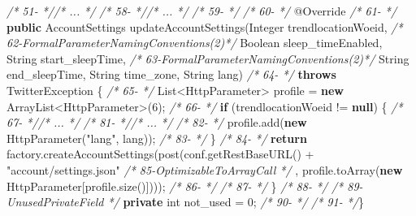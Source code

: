 \documentclass[
]{article}
\newenvironment{Shaded}{\begin{snugshade}}{\end{snugshade}}
\newcommand{\AttributeTok}[1]{\textcolor[rgb]{0.77,0.63,0.00}{#1}}
\newcommand{\BuiltInTok}[1]{#1}
\newcommand{\CommentTok}[1]{\textcolor[rgb]{0.56,0.35,0.01}{\textit{#1}}}
\newcommand{\DataTypeTok}[1]{\textcolor[rgb]{0.13,0.29,0.53}{#1}}
\newcommand{\DecValTok}[1]{\textcolor[rgb]{0.00,0.00,0.81}{#1}}
\newcommand{\FunctionTok}[1]{\textcolor[rgb]{0.00,0.00,0.00}{#1}}
\newcommand{\KeywordTok}[1]{\textcolor[rgb]{0.13,0.29,0.53}{\textbf{#1}}}
\newcommand{\NormalTok}[1]{#1}
\newcommand{\StringTok}[1]{\textcolor[rgb]{0.31,0.60,0.02}{#1}}
\begin{document}
\begin{landscape}
\begin{Shaded}
\begin{Highlighting}[]
\CommentTok{/* 51-                                   *//* ...  */}
\CommentTok{/* 58-                                   *//* ...  */}
\CommentTok{/* 59-                                   */}    
\CommentTok{/* 60-                                   */}    \AttributeTok{@Override}
\CommentTok{/* 61-                                   */}    \KeywordTok{public}\NormalTok{ AccountSettings }\FunctionTok{updateAccountSettings}\NormalTok{(}\BuiltInTok{Integer}\NormalTok{ trendlocationWoeid,}
\CommentTok{/* 62-FormalParameterNamingConventions(2)*/}                                                 \BuiltInTok{Boolean}\NormalTok{ sleep_timeEnabled, }\BuiltInTok{String}\NormalTok{ start_sleepTime,}
\CommentTok{/* 63-FormalParameterNamingConventions(2)*/}                                                 \BuiltInTok{String}\NormalTok{ end_sleepTime, }\BuiltInTok{String}\NormalTok{ time_zone, }\BuiltInTok{String}\NormalTok{ lang)}
\CommentTok{/* 64-                                   */}            \KeywordTok{throws}\NormalTok{ TwitterException \{}
\CommentTok{/* 65-                                   */}        \BuiltInTok{List}\NormalTok{<HttpParameter> profile = }\KeywordTok{new} \BuiltInTok{ArrayList}\NormalTok{<HttpParameter>(}\DecValTok{6}\NormalTok{);}
\CommentTok{/* 66-                                   */}        \KeywordTok{if}\NormalTok{ (trendlocationWoeid != }\KeywordTok{null}\NormalTok{) \{}
\CommentTok{/* 67-                                   *//* ...  */}
\CommentTok{/* 81-                                   *//* ...  */}
\CommentTok{/* 82-                                   */}\NormalTok{            profile.}\FunctionTok{add}\NormalTok{(}\KeywordTok{new} \FunctionTok{HttpParameter}\NormalTok{(}\StringTok{"lang"}\NormalTok{, lang));}
\CommentTok{/* 83-                                   */}\NormalTok{        \}}
\CommentTok{/* 84-                                   */}        \KeywordTok{return}\NormalTok{ factory.}\FunctionTok{createAccountSettings}\NormalTok{(}\FunctionTok{post}\NormalTok{(conf.}\FunctionTok{getRestBaseURL}\NormalTok{() + }\StringTok{"account/settings.json"}
\CommentTok{/* 85-OptimizableToArrayCall             */}\NormalTok{                , profile.}\FunctionTok{toArray}\NormalTok{(}\KeywordTok{new}\NormalTok{ HttpParameter[profile.}\FunctionTok{size}\NormalTok{()])));}
\CommentTok{/* 86-                                   */}
\CommentTok{/* 87-                                   */}\NormalTok{    \}}
\CommentTok{/* 88-                                   */}
\CommentTok{/* 89-UnusedPrivateField                 */}    \KeywordTok{private} \DataTypeTok{int}\NormalTok{ not_used = }\DecValTok{0}\NormalTok{;}
\CommentTok{/* 90-                                   */}
\CommentTok{/* 91-                                   */}\NormalTok{\}}
\end{Highlighting}
\end{Shaded}


\end{landscape}
\end{document}
